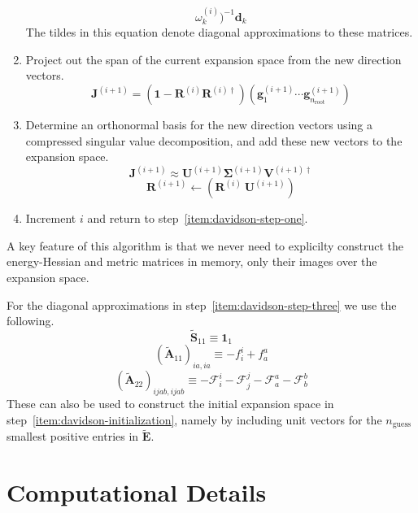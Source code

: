\begin{enumerate}
\[                    \omega_k^{(i)}
                )^{-1}
                \mathbf{d}_k
            \]
            The tildes in this equation denote diagonal approximations to these
            matrices.
        \item
            Project out the span of the current expansion space from the new
            direction vectors.
            \[
                \mathbf{J}^{(i+1)}
                =
                (\mathbf{1} - \mathbf{R}^{(i)}\mathbf{R}^{(i)\dagger})
                (\mathbf{g}_1^{(i+1)}\cdots \mathbf{g}_{n_\mathrm{root}}^{(i+1)})
            \]
        \item
            Determine an orthonormal basis for the new direction vectors using a
            compressed singular value decomposition, and add these new vectors to
            the expansion space.
            \[
                \mathbf{J}^{(i+1)}
                \approx
                \mathbf{U}^{(i+1)}
                \boldsymbol\Sigma^{(i+1)}
                \mathbf{V}^{(i+1)\dagger}
            \]
            \[
                \mathbf{R}^{(i+1)}
                \leftarrow
                (\mathbf{R}^{(i)}\ \mathbf{U}^{(i+1)})
            \]
        \item
            Increment \(i\) and return to step~\ref{item:davidson-step-one}.
    \end{enumerate}
    A key feature of this algorithm is that we never need to explicilty construct
    the energy-Hessian and metric matrices in memory, only their images over the
    expansion space.

    For the diagonal approximations in step~\ref{item:davidson-step-three} we use
    the following.
    \[
        \tilde{\mathbf{S}}_{11}
        \equiv
        \mathbf{1}_1
    \]
    \[
        (\tilde{\mathbf{A}}_{11})_{ia,ia}
        \equiv
        -
        f_i^i
        +
        f_a^a
    \]
    \[
        (\tilde{\mathbf{A}}_{22})_{ijab,ijab}
        \equiv
        -
        \mathcal{F}_i^i
        -
        \mathcal{F}_j^j
    -
    \mathcal{F}_a^a
    -
    \mathcal{F}_b^b
\]
These can also be used to construct the initial expansion space in
step~\ref{item:davidson-initialization}, namely by including unit vectors for
the \(n_\mathrm{guess}\) smallest positive entries in \(\tilde{\mathbf{E}}\).


\section{Computational Details}

